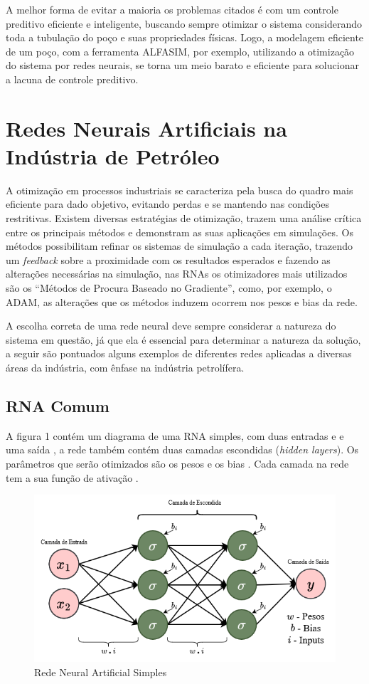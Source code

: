 \documentclass{article}[12pt, openright, oneside, a4paper, portuguese]
\begin{document}
    A melhor forma de evitar a maioria os problemas citados é com um controle preditivo eficiente e inteligente, buscando sempre otimizar o sistema considerando toda a tubulação do poço e suas propriedades físicas. Logo, a modelagem eficiente de um poço, com a ferramenta ALFASIM, por exemplo, utilizando a otimização do sistema por redes neurais, se torna um meio barato e eficiente para solucionar a lacuna de controle preditivo.

\section{Redes Neurais Artificiais na Indústria de Petróleo}

    A otimização em processos industriais se caracteriza pela busca do quadro mais eficiente para dado objetivo, evitando perdas e se mantendo nas condições restritivas. Existem diversas estratégias de otimização,  trazem uma análise crítica entre os principais métodos e demonstram as suas aplicações em simulações. Os métodos possibilitam refinar os sistemas de simulação a cada iteração, trazendo um \textit{feedback} sobre a proximidade com os resultados esperados e fazendo as alterações necessárias na simulação, nas RNAs os otimizadores mais utilizados são os “Métodos de Procura Baseado no Gradiente”, como, por exemplo, o ADAM, as alterações que os métodos induzem ocorrem nos pesos e bias da rede.

    A escolha correta de uma rede neural deve sempre considerar a natureza do sistema em questão, já que ela é essencial para determinar a natureza da solução, a seguir são pontuados alguns exemplos de diferentes redes aplicadas a diversas áreas da indústria, com ênfase na indústria petrolífera.

    \subsection{RNA Comum}

     A figura 1 contém um diagrama de uma RNA simples, com duas entradas  e  e uma saída , a rede também contém duas camadas escondidas (\textit{hidden layers}). Os parâmetros que serão otimizados são os pesos  e os bias . Cada camada na rede tem a sua função de ativação \boldmath{$\sigma$}. 

    \begin{figure}[H]
        \centering
        \includegraphics[width=0.5\linewidth]{src/Imagens/RNA Diagrama.drawio.png}
        \caption{Rede Neural Artificial Simples}
        \label{fig:enter-label}
    \end{figure}
\end{document}
